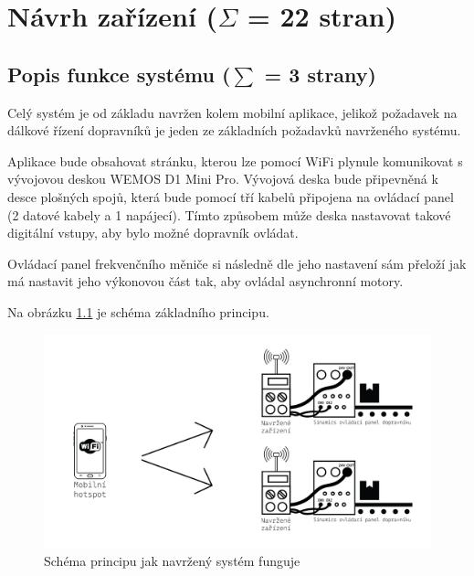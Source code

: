 \chapter{Návrh zařízení ($\Sigma$ = 22 stran)}
\section{Popis funkce systému ($\sum$ = 3 strany)}\label{sec:PopisFunkceSystemu}

Celý systém je od základu navržen kolem mobilní aplikace, jelikož požadavek na dálkové řízení dopravníků je jeden ze základních požadavků navrženého systému.

Aplikace bude obsahovat stránku, kterou lze pomocí WiFi plynule komunikovat s vývojovou deskou WEMOS D1 Mini Pro. Vývojová deska bude připevněná k desce plošných spojů, která bude pomocí tří kabelů připojena na ovládací panel (2 datové kabely a 1 napájecí). Tímto způsobem může deska nastavovat takové digitální vstupy, aby bylo možné dopravník ovládat.

Ovládací panel frekvenčního měniče si následně dle jeho nastavení sám přeloží jak má nastavit jeho výkonovou část tak, aby ovládal asynchronní motory.

Na obrázku \ref{fig:PrincipFunkceZarizeni} je schéma základního principu.

\begin{figure}[hptb]
	\centering
	\includegraphics[width=1\linewidth]{images/FunkcniSchema_DvaOvladace.png}
	\caption{Schéma principu jak navržený systém funguje}
	\label{fig:PrincipFunkceZarizeni}
\end{figure}

